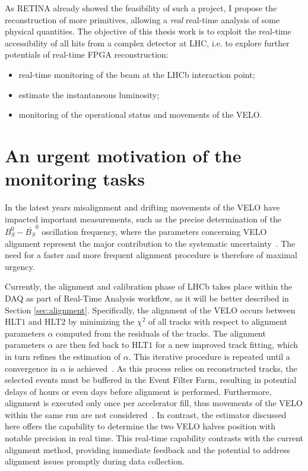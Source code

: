 As RETINA already showed the feasibility of such a project, I propose the reconstruction of more primitives, allowing a \textit{real} real-time analysis of some physical quantities. 
The objective of this thesis work is to exploit the real-time accessibility of all hits from a complex detector at LHC, i.e. to explore further potentials of real-time FPGA reconstruction: 
\begin{itemize}
\item real-time monitoring of the beam at the LHCb interaction point;
\item estimate the instantaneous luminosity;
\item monitoring of the operational status and movements of the VELO.
\end{itemize}

\section{An urgent motivation of the monitoring tasks}

In the latest years misalignment and drifting movements of the VELO have impacted important measurements, such as the precise determination of the $B_S^0-\overline{B_S} ^0$ oscillation frequency, where the parameters concerning VELO alignment represent the major contribution to the systematic uncertainty~\cite{b0b0soscillation}. The need for a faster and more frequent alignment procedure is therefore of maximal urgency.  
    
Currently, the alignment and calibration phase of LHCb takes place within the DAQ as part of Real-Time Analysis workflow, as it will be better described in Section \ref{sec:alignment}. Specifically, the alignment of the VELO occurs between HLT$1$ and HLT$2$ by minimizing the $\chi^2$ of all tracks with respect to alignment parameters $\alpha$ computed from the residuals of the tracks. The alignment parameters $\alpha$ are then fed back to HLT$1$ for a new improved track fitting, which in turn refines the estimation of $\alpha$. This iterative procedure is repeated until a convergence in $\alpha$ is achieved~\cite{FRUHWIRTH1987444, Frühwirth:803519}. As this process relies on reconstructed tracks, the selected events must be buffered in the Event Filter Farm, resulting in potential delays of hours or even days before alignment is performed. Furthermore, alignment is executed only once per accelerator fill, thus movements of the VELO within the same run are not considered~\cite{Dziurda:2640712}. In contrast, the estimator discussed here offers the capability to determine the two VELO halves position with notable precision in real time. This real-time capability contrasts with the current alignment method, providing immediate feedback and the potential to address alignment issues promptly during data collection.

